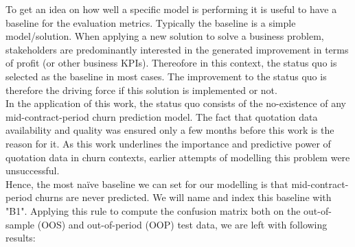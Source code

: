\documentclass[12pt,titlepage]{article}
\begin{document}
To get an idea on how well a specific model is performing it is useful to have a baseline for the evaluation metrics. Typically the baseline is a simple model/solution. When applying a new solution to solve a business problem, stakeholders are predominantly interested in the generated improvement in terms of profit (or other business KPIs). Thereofore in this context, the status quo is selected as the baseline in most cases. The improvement to the status quo is therefore the driving force if this solution is implemented or not. \\
In the application of this work, the status quo consists of the no-existence of any mid-contract-period churn prediction model. The fact that quotation data availability and quality was ensured only a few months before this work is the reason for it. As this work underlines the importance and predictive power of quotation data in churn contexts, earlier attempts of modelling this problem were unsuccessful. \\
Hence, the most naïve baseline we can set for our modelling is that mid-contract-period churns are never predicted. We will name and index this baseline with "B1". Applying this rule to compute the confusion matrix both on the out-of-sample (OOS) and out-of-period (OOP) test data, we are left with following results: \\
\end{document}
